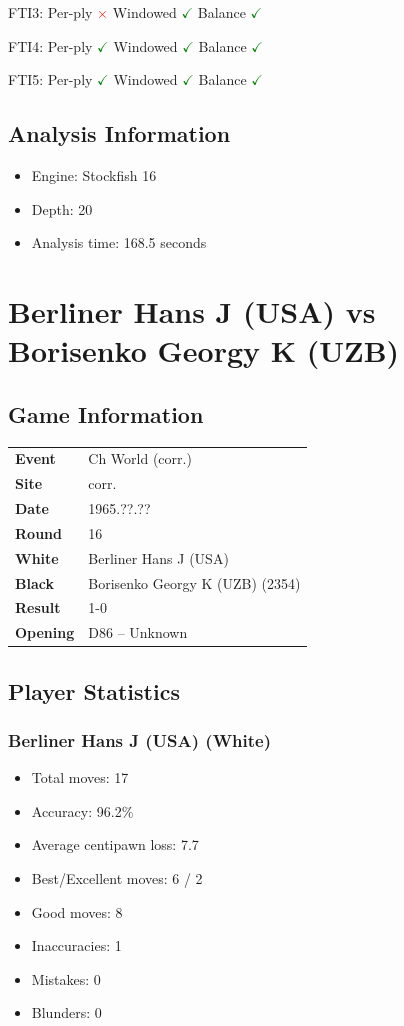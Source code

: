 \documentclass[11pt]{book}
\begin{document}
FTI3: Per-ply \textcolor{red}{$\times$} \quad Windowed \textcolor{green}{$\checkmark$} \quad Balance \textcolor{green}{$\checkmark$}

FTI4: Per-ply \textcolor{green}{$\checkmark$} \quad Windowed \textcolor{green}{$\checkmark$} \quad Balance \textcolor{green}{$\checkmark$}

FTI5: Per-ply \textcolor{green}{$\checkmark$} \quad Windowed \textcolor{green}{$\checkmark$} \quad Balance \textcolor{green}{$\checkmark$}

\section{Analysis Information}
\begin{itemize}
\item Engine: Stockfish 16
\item Depth: 20
\item Analysis time: 168.5 seconds
\end{itemize}

\chapter{Berliner Hans J (USA) vs Borisenko Georgy K (UZB)}

\section{Game Information}
\begin{tabular}{ll}
\textbf{Event} & Ch World (corr.) \\
\textbf{Site} & corr. \\
\textbf{Date} & 1965.??.?? \\
\textbf{Round} & 16 \\
\textbf{White} & Berliner Hans J (USA) \\
\textbf{Black} & Borisenko Georgy K (UZB) (2354) \\
\textbf{Result} & 1-0 \\
\textbf{Opening} & D86 -- Unknown \\
\end{tabular}

\section{Player Statistics}

\subsection{Berliner Hans J (USA) (White)}
\begin{itemize}
\item Total moves: 17
\item Accuracy: 96.2\%
\item Average centipawn loss: 7.7
\item Best/Excellent moves: 6 / 2
\item Good moves: 8
\item Inaccuracies: 1
\item Mistakes: 0
\item Blunders: 0
\end{itemize}
\end{document}
